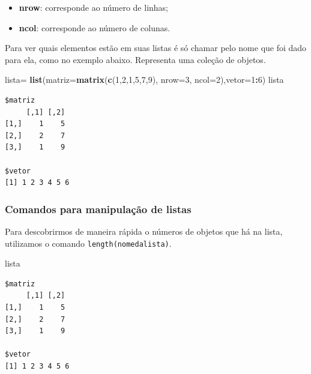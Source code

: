 \documentclass[12pt,brazil,oneside]{book}
\newenvironment{Shaded}{\begin{snugshade}}{\end{snugshade}}
\newcommand{\DataTypeTok}[1]{\textcolor[rgb]{0.13,0.29,0.53}{#1}}
\newcommand{\DecValTok}[1]{\textcolor[rgb]{0.00,0.00,0.81}{#1}}
\newcommand{\KeywordTok}[1]{\textcolor[rgb]{0.13,0.29,0.53}{\textbf{#1}}}
\newcommand{\NormalTok}[1]{#1}
\newcommand{\OperatorTok}[1]{\textcolor[rgb]{0.81,0.36,0.00}{\textbf{#1}}}
\newcommand{\StringTok}[1]{\textcolor[rgb]{0.31,0.60,0.02}{#1}}
\providecommand{\tightlist}{%
  \setlength{\itemsep}{0pt}\setlength{\parskip}{0pt}}
\begin{document}
\begin{itemize}
\tightlist
\item
  \textbf{nrow}: corresponde ao número de linhas;
\item
  \textbf{ncol}: corresponde ao número de colunas.
\end{itemize}

Para ver quais elementos estão em suas listas é só chamar pelo nome que
foi dado para ela, como no exemplo abaixo. Representa uma coleção de
objetos.

\begin{Shaded}
\begin{Highlighting}[]
\NormalTok{lista=}\StringTok{ }\KeywordTok{list}\NormalTok{(}\DataTypeTok{matriz=}\KeywordTok{matrix}\NormalTok{(}\KeywordTok{c}\NormalTok{(}\DecValTok{1}\NormalTok{,}\DecValTok{2}\NormalTok{,}\DecValTok{1}\NormalTok{,}\DecValTok{5}\NormalTok{,}\DecValTok{7}\NormalTok{,}\DecValTok{9}\NormalTok{), }\DataTypeTok{nrow=}\DecValTok{3}\NormalTok{, }\DataTypeTok{ncol=}\DecValTok{2}\NormalTok{),}\DataTypeTok{vetor=}\DecValTok{1}\OperatorTok{:}\DecValTok{6}\NormalTok{)}
\NormalTok{lista}
\end{Highlighting}
\end{Shaded}

\begin{verbatim}
$matriz
     [,1] [,2]
[1,]    1    5
[2,]    2    7
[3,]    1    9

$vetor
[1] 1 2 3 4 5 6
\end{verbatim}

\hypertarget{comandos-para-manipulacao-de-listas}{%
\subsubsection{Comandos para manipulação de
listas}\label{comandos-para-manipulacao-de-listas}}

Para descobrirmos de maneira rápida o números de objetos que há na
lista, utilizamos o comando \texttt{length(nomedalista)}.

\begin{Shaded}
\begin{Highlighting}[]
\NormalTok{lista}
\end{Highlighting}
\end{Shaded}

\begin{verbatim}
$matriz
     [,1] [,2]
[1,]    1    5
[2,]    2    7
[3,]    1    9

$vetor
[1] 1 2 3 4 5 6
\end{verbatim}
\end{document}
